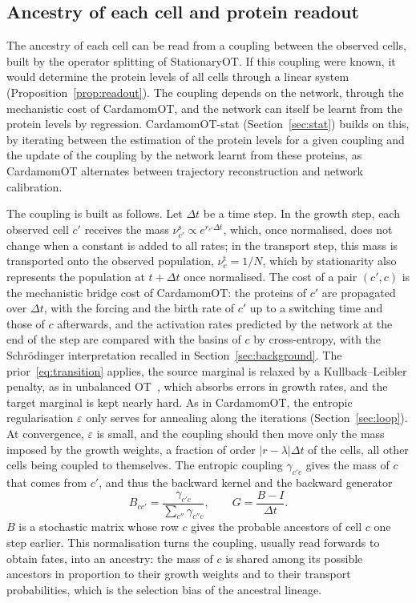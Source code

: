 \documentclass[a4paper, 11pt]{article}
\theoremstyle{plain}
\theoremstyle{remark}
\begin{document}
\subsection{Ancestry of each cell and protein readout}\label{sec:readout}

The ancestry of each cell can be read from a coupling between the observed cells, built by the operator splitting of StationaryOT. If this coupling were known, it would determine the protein levels of all cells through a linear system (Proposition~\ref{prop:readout}). The coupling depends on the network, through the mechanistic cost of CardamomOT, and the network can itself be learnt from the protein levels by regression. CardamomOT-stat (Section~\ref{sec:stat}) builds on this, by iterating between the estimation of the protein levels for a given coupling and the update of the coupling by the network learnt from these proteins, as CardamomOT alternates between trajectory reconstruction and network calibration.

The coupling is built as follows. Let $\Delta t$ be a time step. In the growth step, each observed cell $c'$ receives the mass $\nu^{\mathrm{s}}_{c'} \propto e^{r_{c'}\Delta t}$, which, once normalised, does not change when a constant is added to all rates; in the transport step, this mass is transported onto the observed population, $\nu^{\mathrm{t}}_c = 1/N$, which by stationarity also represents the population at $t + \Delta t$ once normalised. The cost of a pair $(c', c)$ is the mechanistic bridge cost of CardamomOT: the proteins of $c'$ are propagated over $\Delta t$, with the forcing and the birth rate of $c'$ up to a switching time and those of $c$ afterwards, and the activation rates predicted by the network at the end of the step are compared with the basins of $c$ by cross-entropy, with the Schrödinger interpretation recalled in Section~\ref{sec:background}. The prior~\eqref{eq:transition} applies, the source marginal is relaxed by a Kullback--Leibler penalty, as in unbalanced OT~\cite{chizat2018scaling}, which absorbs errors in growth rates, and the target marginal is kept nearly hard. As in CardamomOT, the entropic regularisation $\varepsilon$ only serves for annealing along the iterations (Section~\ref{sec:loop}). At convergence, $\varepsilon$ is small, and the coupling should then move only the mass imposed by the growth weights, a fraction of order $|r - \lambda|\Delta t$ of the cells, all other cells being coupled to themselves. The entropic coupling $\gamma_{c'c}$ gives the mass of $c$ that comes from $c'$, and thus the backward kernel and the backward generator
\begin{equation}\label{eq:Bcell}
B_{cc'} = \frac{\gamma_{c'c}}{\sum_{c''}\gamma_{c''c}} , \qquad G = \frac{B - I}{\Delta t} .
\end{equation}
$B$ is a stochastic matrix whose row $c$ gives the probable ancestors of cell $c$ one step earlier. This normalisation turns the coupling, usually read forwards to obtain fates, into an ancestry: the mass of $c$ is shared among its possible ancestors in proportion to their growth weights and to their transport probabilities, which is the selection bias of the ancestral lineage.
\end{document}
